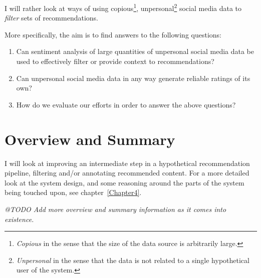 I will rather look at ways of using copious\footnote{\emph{Copious} in the sense that the size of the data source is arbitrarily large.}, unpersonal\footnote{\emph{Unpersonal} in the sense that the data is not related to a single hypothetical user of the system.} social media data to \emph{filter} sets of recommendations.

More specifically, the aim is to find answers to the following questions:

\begin{enumerate}
  \item Can sentiment analysis of large quantities of unpersonal social media data be used to effectively filter or provide context to recommendations?
  \item Can unpersonal social media data in any way generate reliable ratings of its own?
  \item How do we evaluate our efforts in order to answer the above questions?
\end{enumerate}


\section{Overview and Summary}

I will look at improving an intermediate step in a hypothetical recommendation pipeline, filtering and/or annotating recommended content.
For a more detailed look at the system design, and some reasoning around the parts of the system being touched upon, see chapter~\ref{Chapter4}.

\emph{@TODO Add more overview and summary information as it comes into existence.}

